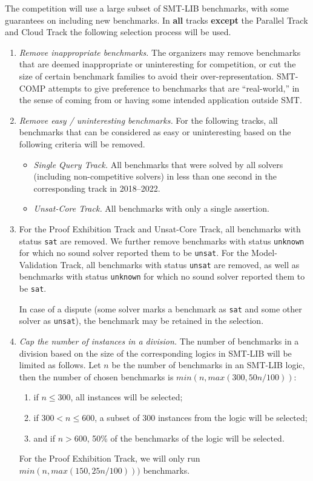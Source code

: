 \documentclass[12pt]{article}
\newcommand{\maintrack}{Single Query Track\xspace}
\newcommand{\ucoretrack}{Unsat-Core Track\xspace}
\newcommand{\mvaltrack}{Model-Validation Track\xspace}
\newcommand{\paralleltrack}{Parallel Track\xspace}
\newcommand{\cloudtrack}{Cloud Track\xspace}
\newcommand{\prooftrack}{Proof Exhibition Track\xspace}
\begin{document}
 \label{benchmark-selection}
The competition will use a large subset of SMT-LIB benchmarks, with some
guarantees on including new benchmarks.  In \textbf{all} tracks
\textbf{except} the \paralleltrack and \cloudtrack
the following selection process will be used.
\begin{enumerate}
\item \emph{Remove inappropriate benchmarks.} The
  organizers may remove benchmarks that are deemed inappropriate or
  uninteresting for competition, or cut the size of certain benchmark
  families to avoid their over-representation.  SMT-COMP attempts to
  give preference to benchmarks that are ``real-world,'' in the sense
  of coming from or having some intended application outside SMT.
\item \emph{Remove easy / uninteresting benchmarks.}
  For the following tracks, all benchmarks that can be
  considered as easy or uninteresting based on the following criteria
  will be removed.
  \begin{itemize}
    \item \emph{\maintrack.} All benchmarks that were solved by all
      solvers (including non-competitive solvers) in less than one second in
          the corresponding track in 2018--2022.
    \item \emph{\ucoretrack.} All benchmarks with only a single assertion.
  \end{itemize}

\item
  For the \prooftrack and \ucoretrack, all benchmarks with status
  \texttt{sat} are removed.  We further remove benchmarks with status
  \texttt{unknown} for which no sound solver reported them to be
  \texttt{unsat}.
  For the \mvaltrack,  all benchmarks with status \texttt{unsat} are removed,
  as well as benchmarks with status
  \texttt{unknown} for which no sound solver reported them to be
  \texttt{sat}.

  In case of a dispute (some solver marks a benchmark as \texttt{sat}
  and some other solver as \texttt{unsat}), the benchmark may be retained in
  the selection.

\item \emph{Cap the number of instances in a division.}
  The number of benchmarks in a division based on the size of the
  corresponding logics in SMT-LIB will be limited as follows.
  Let $n$ be the number of benchmarks in an SMT-LIB logic, then
  the number of chosen benchmarks is $min(n, max(300, 50n/100))$:
  \begin{enumerate}
  \vspace{-1ex}
    \item \label{bench-sel-300} if $n \le 300$, all instances will be selected;
  \item \label{bench-sel-600} if $300 < n \leq 600$, a subset of 300 instances
    from the logic will be selected;
  \item \label{bench-sel-more} and if $n > 600$,
      50\% of the benchmarks of the logic will be selected.
    \end{enumerate}
    For the \prooftrack, we will only run $min(n, max(150,
    25n/100)))$ benchmarks.
\end{enumerate}
\end{document}
